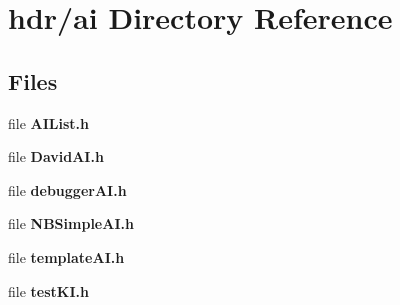\section{hdr/ai Directory Reference}
\label{dir_04cf6b94e5f246ace4dcca20476db399}
\subsection*{Files}
\begin{DoxyCompactItemize}
\item 
file {\bfseries A\-I\-List.\-h}
\item 
file {\bfseries David\-A\-I.\-h}
\item 
file {\bfseries debugger\-A\-I.\-h}
\item 
file {\bfseries N\-B\-Simple\-A\-I.\-h}
\item 
file {\bfseries template\-A\-I.\-h}
\item 
file {\bfseries test\-K\-I.\-h}
\end{DoxyCompactItemize}
